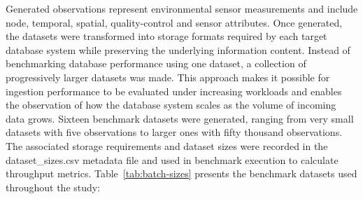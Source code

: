 Generated observations represent environmental sensor measurements and include node, temporal, spatial, quality-control and sensor attributes. Once generated, the datasets were transformed into storage formats required by each target database system while preserving the underlying information content. Instead of benchmarking database performance using one dataset, a collection of progressively larger datasets was made. This approach makes it possible for ingestion performance to be evaluated under increasing workloads and enables the observation of how the database system scales as the volume of incoming data grows. Sixteen benchmark datasets were generated, ranging from very small datasets with five observations to larger ones with fifty thousand observations. The associated storage requirements and dataset sizes were recorded in the dataset\_sizes.csv metadata file and used in benchmark execution to calculate throughput metrics. Table~\ref{tab:batch-sizes} presents the benchmark datasets used throughout the study:



